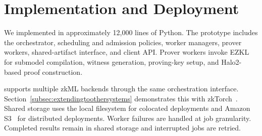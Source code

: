
\section{Implementation and Deployment}
We implemented \TITLE{} in approximately 12{,}000 lines of Python. The prototype includes the orchestrator, scheduling and admission policies, worker managers, prover workers, shared-artifact interface, and client API. Prover workers invoke EZKL~\cite{ezkl} for submodel compilation, witness generation, proving-key setup, and Halo2-based proof construction.

\TITLE{} supports multiple zkML backends through the same orchestration interface. Section~\ref{subsec:extendingtoothersystems} demonstrates this with zkTorch~\cite{chen2025zktorch}. Shared storage uses the local filesystem for colocated deployments and Amazon S3~\cite{aws-s3} for distributed deployments. Worker failures are handled at job granularity. Completed results remain in shared storage and interrupted jobs are retried.











